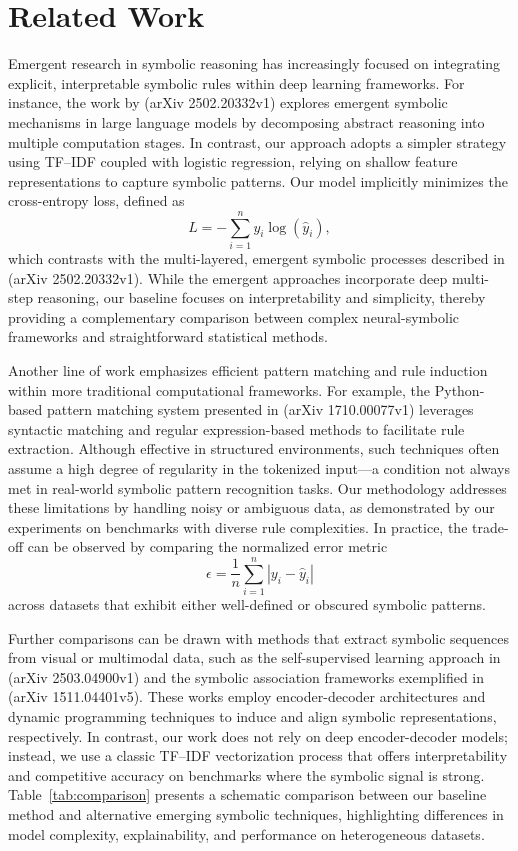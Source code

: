 \documentclass{article}
\begin{document}
\section{Related Work}
Emergent research in symbolic reasoning has increasingly focused on integrating explicit, interpretable symbolic rules within deep learning frameworks. For instance, the work by (arXiv 2502.20332v1) explores emergent symbolic mechanisms in large language models by decomposing abstract reasoning into multiple computation stages. In contrast, our approach adopts a simpler strategy using TF–IDF coupled with logistic regression, relying on shallow feature representations to capture symbolic patterns. Our model implicitly minimizes the cross-entropy loss, defined as 
\[
L = -\sum_{i=1}^{n} y_i \log(\hat{y}_i),
\]
which contrasts with the multi-layered, emergent symbolic processes described in (arXiv 2502.20332v1). While the emergent approaches incorporate deep multi-step reasoning, our baseline focuses on interpretability and simplicity, thereby providing a complementary comparison between complex neural-symbolic frameworks and straightforward statistical methods.

Another line of work emphasizes efficient pattern matching and rule induction within more traditional computational frameworks. For example, the Python-based pattern matching system presented in (arXiv 1710.00077v1) leverages syntactic matching and regular expression-based methods to facilitate rule extraction. Although effective in structured environments, such techniques often assume a high degree of regularity in the tokenized input—a condition not always met in real-world symbolic pattern recognition tasks. Our methodology addresses these limitations by handling noisy or ambiguous data, as demonstrated by our experiments on benchmarks with diverse rule complexities. In practice, the trade-off can be observed by comparing the normalized error metric 
\[
\epsilon = \frac{1}{n}\sum_{i=1}^{n} \left|y_i - \hat{y}_i\right|
\]
across datasets that exhibit either well-defined or obscured symbolic patterns.

Further comparisons can be drawn with methods that extract symbolic sequences from visual or multimodal data, such as the self-supervised learning approach in (arXiv 2503.04900v1) and the symbolic association frameworks exemplified in (arXiv 1511.04401v5). These works employ encoder-decoder architectures and dynamic programming techniques to induce and align symbolic representations, respectively. In contrast, our work does not rely on deep encoder-decoder models; instead, we use a classic TF–IDF vectorization process that offers interpretability and competitive accuracy on benchmarks where the symbolic signal is strong. Table~\ref{tab:comparison} presents a schematic comparison between our baseline method and alternative emerging symbolic techniques, highlighting differences in model complexity, explainability, and performance on heterogeneous datasets.
\end{document}
